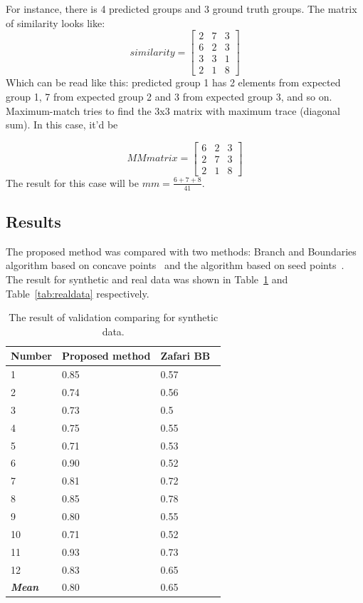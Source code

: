 \documentclass{lutmscthesis}[2010/09/22]
\begin{document}
For instance, there is 4 predicted groups and 3 ground truth groups. The matrix of similarity looks like:
\begin{equation}
similarity = 
        \begin{bmatrix}
            2& 7 & 3 \\
            6& 2 & 3\\
            3& 3& 1\\
            2& 1 & 8
        \end{bmatrix}
    \end{equation}
Which can be read like this: predicted group 1 has 2 elements from expected group 1, 7 from expected group 2 and 3 from expected group 3, and so on.
Maximum-match tries to find the 3x3 matrix with maximum trace (diagonal sum). In this case, it'd be

\begin{equation}
MMmatrix = 
        \begin{bmatrix}
            6& 2 & 3\\
            2& 7 & 3 \\
            2& 1 & 8
        \end{bmatrix}
    \end{equation}
The result for this case will be $mm = \frac{6+7+8}{41}$.

\subsection{Results}

The proposed method was compared with two methods: Branch and Boundaries algorithm based on concave points~\cite{zafari-bb} and the algorithm based on seed points~\cite{Zafari15}. The result for synthetic and  real data was shown in Table~\ref{tab:syndata} and Table~\ref{tab:realdata} respectively.


\begin{table}[hpt]
\begin{center}
\caption{The result of validation comparing for synthetic data.\label{tab:syndata}}
\begin{tabular}{ |p{2cm}||p{3cm}|p{3cm}|  }
 \hline
 Number & Proposed method & Zafari BB~\cite{zafari-bb}\\
 \hline
 1   &  0.85&  0.57\\
 2   &  0.74&  0.56\\
 3   &  0.73&  0.5\\
 4   &  0.75&  0.55\\
 5   &  0.71&  0.53\\
 6   &  0.90&  0.52\\
 7   &  0.81&  0.72\\
 8   &  0.85&  0.78\\
 9   &  0.80&  0.55\\
 10  &  0.71&  0.52\\
 11  &  0.93&  0.73\\
 12  &  0.83&  0.65\\
 \hline
 \textbf{\textit{Mean}} & 0.80 & 0.65 \\
 \hline
\end{tabular}
\end{center}
\end{table}
\end{document}
